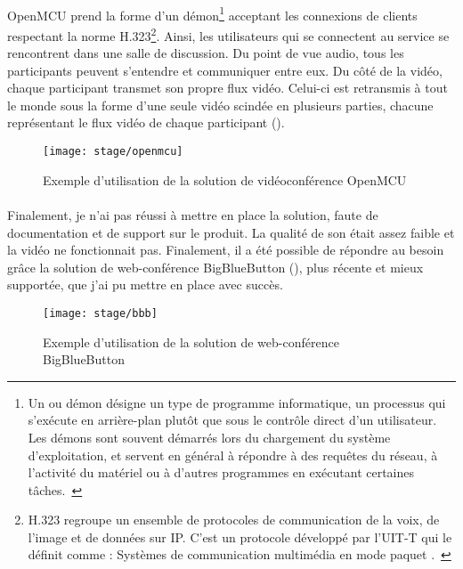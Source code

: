 \paragraph{}
OpenMCU prend la forme d'un démon\footnote{Un  ou démon désigne un type de programme informatique, un processus qui s'exécute en arrière-plan plutôt que sous le contrôle direct d'un utilisateur. Les démons sont souvent démarrés lors du chargement du système d'exploitation, et servent en général à répondre à des requêtes du réseau, à l'activité du matériel ou à d'autres programmes en exécutant certaines tâches.~\cite{demon}} acceptant les connexions de clients respectant la norme H.323\footnote{H.323 regroupe un ensemble de protocoles de communication de la voix, de l'image et de données sur IP. C'est un protocole développé par l'UIT-T qui le définit comme : \og Systèmes de communication multimédia en mode paquet \fg.~\cite{h323}}.
Ainsi, les utilisateurs qui se connectent au service se rencontrent dans une salle de discussion.
Du point de vue audio, tous les participants peuvent s'entendre et communiquer entre eux.
Du côté de la vidéo, chaque participant transmet son propre flux vidéo. Celui-ci est retransmis à tout le monde sous la forme d'une seule vidéo scindée en plusieurs parties, chacune représentant le flux vidéo de chaque participant ().

\begin{figure}
	\centering
	\texttt{[image: stage/openmcu]}
	\caption{Exemple d'utilisation de la solution de vidéoconférence OpenMCU}
	\label{figure:stage:openmcu}
\end{figure}

\paragraph{}
Finalement, je n'ai pas réussi à mettre en place la solution, faute de documentation et de support sur le produit.
La qualité de son était assez faible et la vidéo ne fonctionnait pas.
Finalement, il a été possible de répondre au besoin grâce la solution de web-conférence BigBlueButton (), plus récente et mieux supportée, que j'ai pu mettre en place avec succès.

\begin{figure}[htb]
	\centering
	\texttt{[image: stage/bbb]}
	\caption{Exemple d'utilisation de la solution de web-conférence BigBlueButton}
	\label{figure:stage:bbb}
\end{figure}

